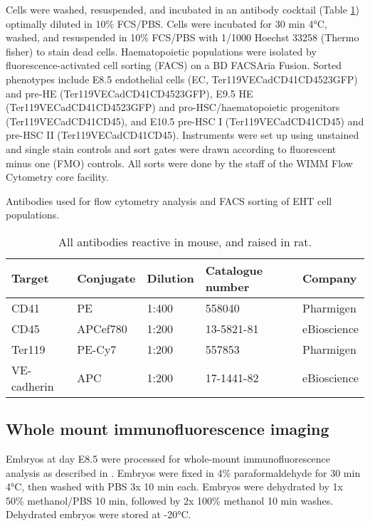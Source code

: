 Cells were washed, resuspended, and incubated in an antibody cocktail (Table \ref{tbl:ch2_mesc-ab}) optimally diluted in 10\% FCS/PBS. Cells were incubated for 30 min 4°C, washed, and resuspended in 10\% FCS/PBS with 1/1000 Hoechst 33258 (Thermo fisher) to stain dead cells. Haematopoietic populations were isolated by fluorescence-activated cell sorting (FACS) on a BD FACSAria Fusion. Sorted phenotypes include E8.5 endothelial cells (EC, Ter119\uneg{}VECad\upos{}CD41\uneg{}CD45\uneg{}23GFP\uneg{}) and pre-HE (Ter119\uneg{}VECad\upos{}CD41\uneg{}CD45\uneg{}23GFP\upos{}), E9.5 HE (Ter119\uneg{}VECad\upos{}\-CD41\uneg{}CD45\uneg{}23GFP\upos{}) and pro-HSC/haematopoietic progenitors (Ter119\uneg{}VECad\upos{}CD41\upos{}CD45\uneg{}), and E10.5 pre-HSC I (Ter119\uneg{}VECad\upos{}\-CD41\upos{}CD45\uneg{}) and pre-HSC II (Ter119\uneg{}VECad\upos{}CD41\upos{}CD45\upos{}). Instruments were set up using unstained and single stain controls and sort gates were drawn according to fluorescent minus one (FMO) controls. All sorts were done by the staff of the WIMM Flow Cytometry core facility. 

    \begin{table}[ht]
    \centering
    \caption{Antibodies used for flow cytometry analysis and FACS sorting of EHT cell populations.}
    \begin{tabular}{@{}lllll@{}}
    \toprule
    \textbf{Target} & \textbf{Conjugate} & \textbf{Dilution} & \textbf{Catalogue   number} & \textbf{Company} \\ \midrule
    CD41 & PE & 1:400 & 558040 & Pharmigen \\
    CD45 & APCef780 & 1:200 & 13-5821-81 & eBioscience \\
    Ter119 & PE-Cy7 & 1:200 & 557853 & Pharmigen \\
    VE-cadherin & APC & 1:200 & 17-1441-82 & eBioscience \\ \bottomrule
    \end{tabular}
    \caption*{All antibodies reactive in mouse, and raised in rat.}
    \label{tbl:ch2_mesc-ab}
    \end{table}
    
\subsection{Whole mount immunofluorescence imaging}

Embryos at day E8.5 were processed for whole-mount immunofluorescence analysis as described in \cite{yokomizo_whole-mount_2012}. Embryos were fixed in 4\% paraformaldehyde for 30 min 4°C, then washed with PBS 3x 10 min each. Embryos were dehydrated by 1x 50\% methanol/PBS 10 min, followed by 2x 100\% methanol 10 min washes. Dehydrated embryos were stored at -20°C. 

